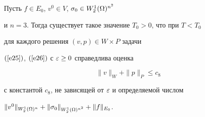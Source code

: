 







\begin{thms}\label{t52}


Пусть $f \in E_0$, $v^0 \in V$, $\sigma_0 \in W_2^1(\Omega)^{n^2}$


и $n=3$. Тогда существует такое значение $T_0>0$, что при $T<T_0$


для каждого решения $(v,p) \in W \times P$ задачи


$(\ref{e25})$, $(\ref{e26})$ с $\varepsilon \ge 0$ справедлива оценка


\begin{equation}\label{e53}


\|v\|_W+\|p\|_P \le c_8


\end{equation}


с константой $c_8$, не зависящей от $\varepsilon$ и определяемой числом


$\|v^0\|_{W_2^1(\Omega)^n}+\|\sigma_0\|_{W^1_2(\Omega)^{n^2}}+\|f\|_{E_0}$.


\end{thms}





